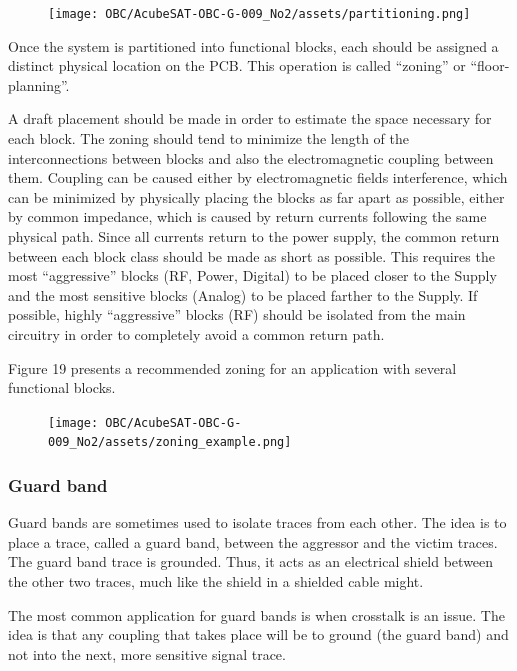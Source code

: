\documentclass[final]{cubedoc}
\begin{document}
	\begin{figure}[h!]
		\centering
		\texttt{[image: OBC/AcubeSAT-OBC-G-009\_No2/assets/partitioning.png]}
	\end{figure}{}
	
	Once the system is partitioned into functional blocks, each should be assigned a distinct physical location on the PCB. This operation is called “zoning” or “floor-planning”. 
	
	A draft placement should be made in order to estimate the space necessary for each block. The zoning should tend to minimize the length of the interconnections between blocks and also the electromagnetic coupling between them. Coupling can be caused either by electromagnetic fields interference, which can be minimized by physically placing the blocks as far apart as possible, either by common impedance, which is caused by return currents following the same physical path. Since all currents return to the power supply, the common return between each block class should be made as short as possible. This requires the most “aggressive” blocks (RF, Power, Digital) to be placed closer to the Supply and the most sensitive blocks (Analog) to be placed farther to the Supply. If possible, highly “aggressive” blocks (RF) should be isolated from the main circuitry in order to completely avoid a common return path.
	
	Figure 19 presents a recommended zoning for an application with several functional blocks.
	
	\pagebreak
	
	\begin{figure}[h!]
		\centering
		\texttt{[image: OBC/AcubeSAT-OBC-G-009\_No2/assets/zoning\_example.png]}
		\caption{}
		\label{fig:my_label}
	\end{figure}
	
	\subsubsection{Guard band}
	Guard bands are sometimes used to isolate traces from each other. The idea is
	to place a trace, called a guard band, between the aggressor and the victim
	traces. The guard band trace is grounded. Thus, it acts as an electrical shield between the other two traces, much like the shield in a shielded cable might.
	
	The most common application for guard bands is when crosstalk is an issue.
	The idea is that any coupling that takes place will be to ground (the guard
	band) and not into the next, more sensitive signal trace.
	
\end{document}
